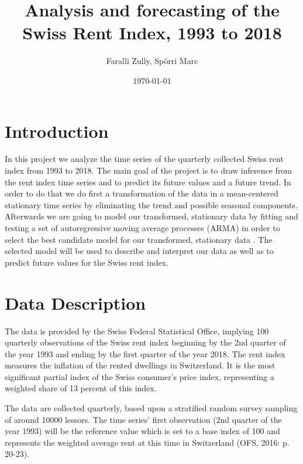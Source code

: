 \documentclass[11pt,a4paper]{article}
\title{Analysis and forecasting of the Swiss Rent Index, 1993 to 2018}
\author{Faralli Zully, Spörri Marc}
\date{\today}
\begin{document}
\maketitle
\newpage

\tableofcontents
\newpage



\section{Introduction}

In this project we analyze the time series of the quarterly collected Swiss rent index from 1993 to 2018.
The main goal of the project is to draw inference from the rent index time series and to predict its future values and a future trend.
In order to do that we do first a transformation of the data in a mean-centered stationary time series by eliminating the trend and possible seasonal components.
Afterwards we are going to model our transformed, stationary data by fitting and testing a set of autoregressive moving average processes (ARMA) in order to select the best candidate model for our transformed, stationary data \cite[p.~82--110]{bd02}.
The selected model will be used to describe and interpret our data as well as to predict future values for the Swiss rent index.



\section{Data Description}

The data is provided by the Swiss Federal Statistical Office, implying 100 quarterly observations of the Swiss rent index beginning by the 2nd quarter of the year 1993 and ending by the first quarter of the year 2018.
The rent index measures the inflation of the rented dwellings in Switzerland.
It is the most significant partial index of the Swiss consumer’s price index, representing a weighted share of 13 percent of this index.

The data are collected quarterly, based upon a stratified random survey sampling of around \num{10000} lessors.
The time series' first observation (2nd quarter of the year 1993) will be the reference value which is set to a base index of 100 and represents the weighted average rent at this time in Switzerland (OFS, 2016: p. 20-23).
\end{document}
